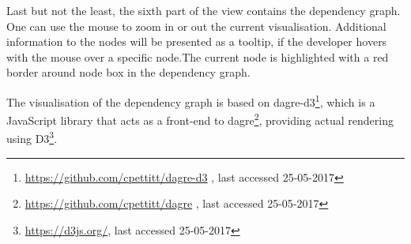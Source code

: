 Last but not the least, the sixth part of the view contains the dependency graph. One can use the mouse to zoom in or out the current visualisation. Additional information to the nodes will be presented as a tooltip, if the developer hovers with the mouse over a specific node.The current node is highlighted with a red border around node box in the dependency graph.

The visualisation of the dependency graph is based on dagre-d3\footnote{\url{https://github.com/cpettitt/dagre-d3} , last accessed 25-05-2017}, which is a JavaScript library that acts as a front-end to dagre\footnote{\url{https://github.com/cpettitt/dagre} , last accessed 25-05-2017}, providing actual rendering using D3\footnote{\url{https://d3js.org/}, last accessed 25-05-2017}.
